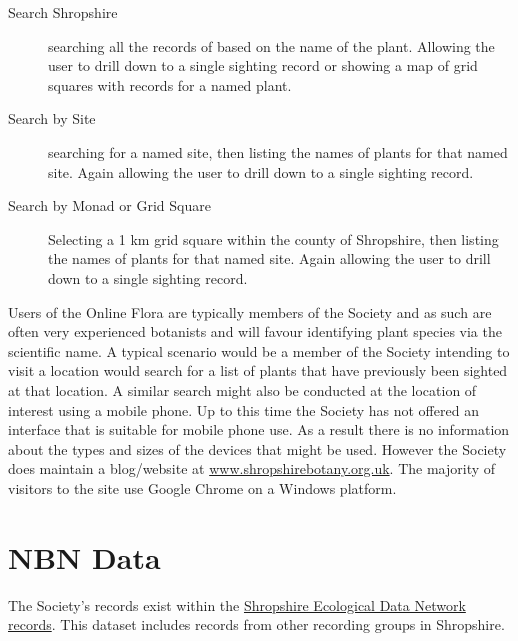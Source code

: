 \documentclass[a4paper,12pt,landscape]{article}
\begin{document}
\begin{multicols*}{2}
  \begin{description}
      \item[Search Shropshire]
        searching all the records of based on the name of the plant.
        Allowing the user to drill down to a single sighting record
        or
        showing a map of grid squares with records for a named plant.
      \item[Search by Site]
        searching for a named site,
        then listing the names of plants for that named site.
        Again allowing the user to drill down to a single sighting record.
      \item[Search by Monad or Grid Square]
        Selecting a 1 km grid square within the county of Shropshire,
        then listing the names of plants for that named site.
        Again allowing the user to drill down to a single sighting record.
  \end{description}

  Users of the Online Flora are typically
  members of the Society
  and
  as such are often very experienced botanists
  and will favour identifying
  plant species via the scientific name.
  A typical scenario would be a member of the Society
  intending to visit a location
  would search for a list of plants that have previously
  been sighted at that location.
  A similar search might also be
  conducted at the location of interest using a mobile phone.
  Up to this time the Society has not offered an interface that is suitable for mobile phone use.
  As a result there is no information about the types and sizes of the devices that might be used.
  However the Society does maintain a blog/website at 
  \href{https://www.shropshirebotany.org.uk/}{www.shropshirebotany.org.uk}.
  The majority of visitors to the site
  use Google Chrome on a Windows platform.

  \section{NBN Data}
  The Society's records exist within
  the \href{https://registry.nbnatlas.org/public/show/dp120}{Shropshire Ecological Data Network records}.
  This dataset includes records from other recording groups in Shropshire.

  
\end{multicols*}
\end{document}
